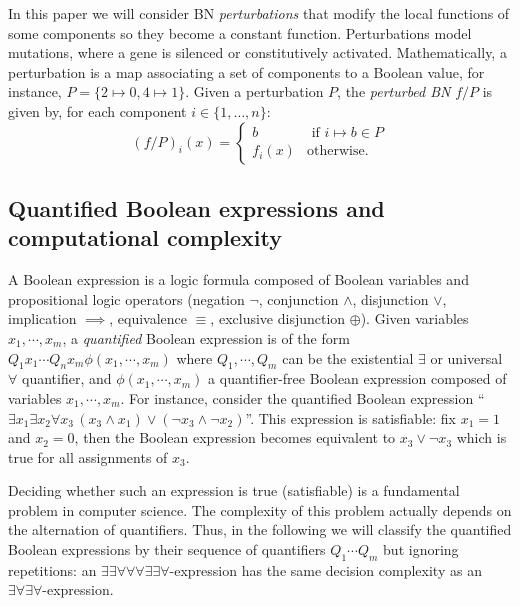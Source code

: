 \documentclass[PCJ,Unicode,screen,mode=plain]{cedram}
\begin{document}
In this paper we will consider BN \emph{perturbations} that modify the
local functions of some components so they become a constant function.
Perturbations model mutations, where a gene is silenced or
constitutively activated. Mathematically, a perturbation is a map
associating a set of components to a Boolean value, for instance,
\(P = \{ 2 \mapsto 0, 4 \mapsto 1\}\). Given a perturbation \(P\), the
\emph{perturbed BN} \(f/P\) is given by, for each component
\(i\in \{1,\ldots,n\}\): \[
(f/P)_i(x) = \begin{cases}
b & \text{ if }i \mapsto b \in P\\
f_i(x) & \text{otherwise.}
\end{cases}
\]
\hypertarget{quantified-boolean-expressions-and-computational-complexity}{%
\subsection{Quantified Boolean expressions and computational
complexity}\label{quantified-boolean-expressions-and-computational-complexity}}

A Boolean expression is a logic formula composed of Boolean variables
and propositional logic operators (negation \(\neg\), conjunction
\(\wedge\), disjunction \(\vee\), implication \(\implies\), equivalence
\(\equiv\), exclusive disjunction \(\oplus\)). Given variables
\(x_1,\cdots,x_m\), a \emph{quantified} Boolean expression is of the
form \(Q_1 x_1 \cdots Q_n x_m \phi(x_1, \cdots, x_m)\) where
\(Q_1, \cdots, Q_m\) can be the existential \(\exists\) or universal
\(\forall\) quantifier, and \(\phi(x_1,\cdots,x_m)\) a quantifier-free
Boolean expression composed of variables \(x_1, \cdots, x_m\). For
instance, consider the quantified Boolean expression
``\(\exists x_1\exists x_2 \forall x_3\, (x_3 \wedge x_1) \vee (\neg x_3 \wedge \neg x_2)\)''.
This expression is satisfiable: fix \(x_1=1\) and \(x_2=0\), then the
Boolean expression becomes equivalent to \(x_3 \vee \neg x_3\) which is
true for all assignments of \(x_3\).

Deciding whether such an expression is true (satisfiable) is a
fundamental problem in computer science. The complexity of this problem
actually depends on the alternation of quantifiers. Thus, in the
following we will classify the quantified Boolean expressions by their
sequence of quantifiers \(Q_1\cdots Q_m\) but ignoring repetitions: an
\(\exists\exists\forall\forall\forall\exists\exists\forall\)-expression
has the same decision complexity as an
\(\exists\forall\exists\forall\)-expression.
\end{document}
